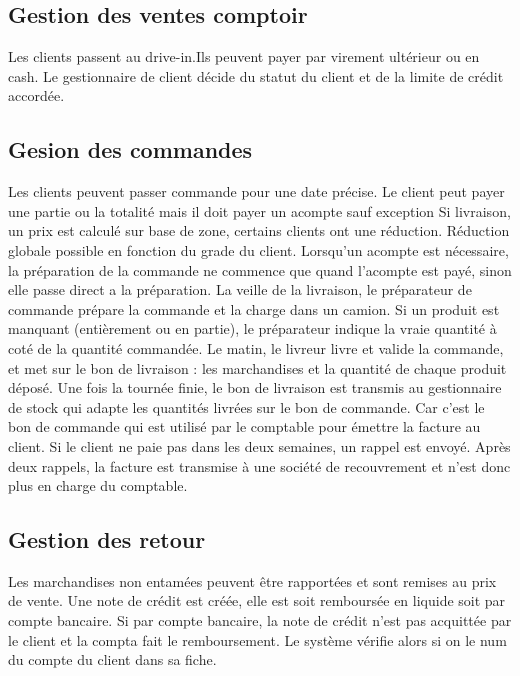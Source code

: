 \documentclass[a4paper,11pt]{article}
\begin{document}
\subsection{Gestion des ventes comptoir}
Les clients passent au drive-in.Ils peuvent payer par virement ultérieur ou en cash. Le gestionnaire de client décide du statut du client et de la limite de crédit accordée.
\subsection{Gesion des commandes}
Les clients peuvent passer commande pour une date précise. Le client peut payer une partie ou la totalité mais il doit payer un acompte sauf exception
Si livraison, un prix est calculé sur base de zone, certains clients ont une réduction.
Réduction globale possible en fonction du grade du client.
Lorsqu’un acompte est nécessaire, la préparation de la commande ne commence que quand l’acompte est payé, sinon elle passe direct a la préparation.
La veille de la livraison, le préparateur de commande prépare la commande et la charge dans un camion. Si un produit est manquant (entièrement ou en partie), le préparateur indique la vraie quantité à coté de la quantité commandée. Le matin, le livreur livre et valide la commande, et met sur le bon de livraison : les marchandises et la quantité de chaque produit déposé.
Une fois la tournée finie, le bon de livraison est transmis au gestionnaire de stock qui adapte les quantités livrées sur le bon de commande. Car c’est le bon de commande qui est utilisé par le comptable pour émettre la facture au client.
Si le client ne paie pas dans les deux semaines, un rappel est envoyé. Après deux rappels, la facture est transmise à une société de recouvrement et n’est donc plus en charge du comptable.

\subsection{Gestion des retour}
Les marchandises non entamées peuvent être rapportées et sont remises au prix de vente. Une note de crédit est créée, elle est soit remboursée en liquide soit par compte bancaire. Si par compte bancaire, la note de crédit n’est pas acquittée par le client et la compta fait le remboursement. Le système vérifie alors si on le num du compte du client dans sa fiche.
\end{document}
